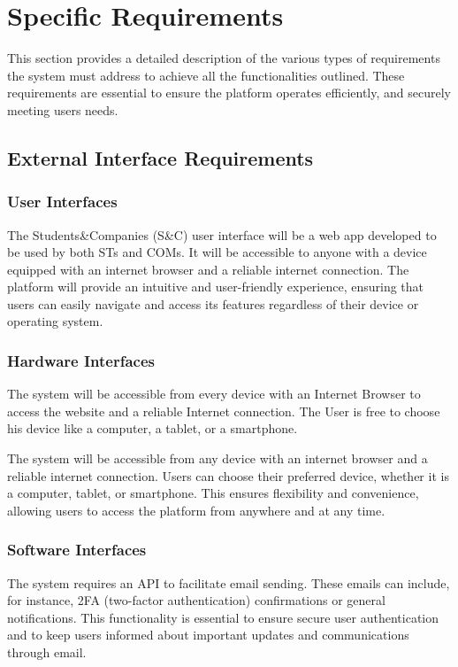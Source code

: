
\chapter{Specific Requirements}
This section provides a detailed description of the various types of requirements the system must address to achieve all the functionalities outlined. These requirements are essential to ensure the platform operates efficiently, and securely meeting users needs. 

\section{External Interface Requirements}
\subsection{User Interfaces}
The Students\&Companies (S\&C) user interface will be a web app developed to be used by both STs and COMs. It will be accessible to anyone with a device equipped with an internet browser and a reliable internet connection. The platform will provide an intuitive and user-friendly experience, ensuring that users can easily navigate and access its features regardless of their device or operating system.

\subsection{Hardware Interfaces}
The system will be accessible from every device with an Internet Browser to access the website and a reliable Internet connection. The User is free to choose his device like a computer, a tablet, or a smartphone.

The system will be accessible from any device with an internet browser and a reliable internet connection. Users can choose their preferred device, whether it is a computer, tablet, or smartphone. This ensures flexibility and convenience, allowing users to access the platform from anywhere and at any time.

\subsection{Software Interfaces}
The system requires an API to facilitate email sending. These emails can include, for instance, 2FA (two-factor authentication) confirmations or general notifications. This functionality is essential to ensure secure user authentication and to keep users informed about important updates and communications through email.
 
